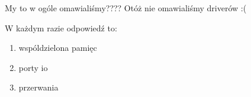My to w ogóle omawialiśmy????
Otóż nie omawialiśmy driverów :(

W każdym razie odpowiedź to:
\begin{enumerate}
    \item wspóldzielona pamięc
    \item porty io
    \item przerwania
\end{enumerate}
